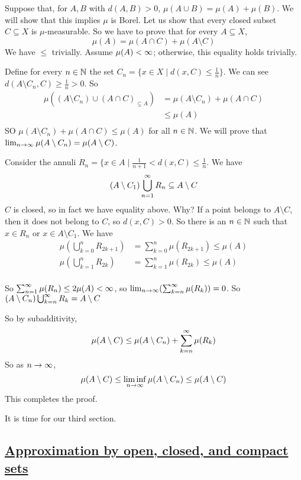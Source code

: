\documentclass[x11names,reqno,14pt]{extarticle}
\newcommand{\seq}[1]{_{#1 = 1}^\oo}
\newcommand{\bigcupn}{\bigcup\seq{n}}
\begin{document}
Suppose that, for $A, B$ with $d(A, B) > 0$, $\mu(A \cup B) = \mu(A) + \mu(B)$. We will show that this implies $\mu$ is Borel. Let us show that every closed subset $C\subseteq X$ is $\mu$-measurable. So we have to prove that for every $A \subseteq X$, 
\[
\mu(A) = \mu(A \cap C) + \mu(A\setminus C)
\]
We have $\leq$ trivially. Assume $\mu(A)<\infty$; otherwise, this equality holds trivially. 

Define for every $n \in \mathbb{N}$ the set $C_n = \{x\in X \mid d(x, C) \leq \frac{1}{n}\}$. We can see $d(A\setminus C_n, C) \geq \frac{1}{n} > 0$. So
\begin{align*}
\mu({(A\setminus C_n)\cup (A \cap C)}_{\subseteq A}) & = \mu(A \setminus C_n) + \mu(A \cap C) \\
& \leq \mu(A)\\
\end{align*}
SO $\mu(A \setminus C_n) + \mu(A \cap C) \leq \mu(A)$ for all $n \in \mathbb{N}$. We will prove that $\lim_{n\to\infty}\mu(A\setminus C_n) = \mu(A \setminus C)$. 

Consider the annuli $R_n = \{x \in A \mid \frac{1}{n + 1} < d(x, C) \leq \frac{1}{n}$. We have
\[
(A\setminus C_1) \bigcupn R_n \subseteq A \setminus C
\]
$C$ is closed, so in fact we have equality above. Why? If a point belongs to $A \setminus C$, then it does not belong to $C$, so $d(x, C) > 0$. So there is an $n\in\mathbb{N}$ such that $x \in R_n$ or $x \in A \setminus C_1$. We have
\begin{align*}
\mu\left(\bigcup_{k=0}^nR_{2k + 1}\right) & = \sum_{k=0}^n\mu(R_{2k + 1})  \leq \mu(A) \\
\mu\left(\bigcup_{k=1}^nR_{2k}\right) & = \sum_{k=1}^n\mu(R_{2k}) \leq \mu(A) \\
\end{align*}

So $\sum\seq{n}\mu(R_n) \leq 2\mu(A)<\oo$, so $\lim_{n\to\infty}(\sum_{k=n}^\infty\mu(R_k)) = 0$. So $(A \setminus C_n) \bigcup_{k=n}^\infty R_k = A \setminus C$

So by subadditivity, 
\[
\mu(A\setminus C) \leq \mu(A\setminus C_n) + \sum_{k=n}^\infty\mu(R_k)
\]
So as $n\to\infty$, 
\[
\mu(A \setminus C) \leq \liminf_{n\to\infty}\mu(A\setminus C_n) \leq \mu(A \setminus C)
\]
This completes the proof. 

It is time for our third section. 

\subsection*{\underline{Approximation by open, closed, and compact sets}}
\end{document}

